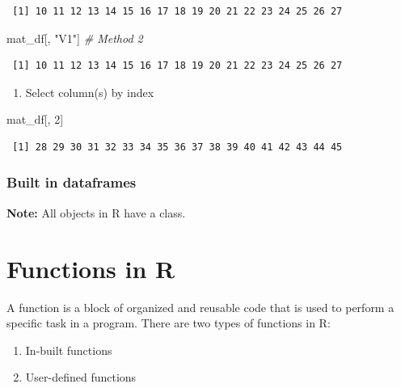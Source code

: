 \documentclass[]{book}
\newenvironment{Shaded}{\begin{snugshade}}{\end{snugshade}}
\newcommand{\CommentTok}[1]{\textcolor[rgb]{0.56,0.35,0.01}{\textit{#1}}}
\newcommand{\DecValTok}[1]{\textcolor[rgb]{0.00,0.00,0.81}{#1}}
\newcommand{\NormalTok}[1]{#1}
\newcommand{\StringTok}[1]{\textcolor[rgb]{0.31,0.60,0.02}{#1}}
\providecommand{\tightlist}{%
  \setlength{\itemsep}{0pt}\setlength{\parskip}{0pt}}
\begin{document}
\begin{verbatim}
 [1] 10 11 12 13 14 15 16 17 18 19 20 21 22 23 24 25 26 27
\end{verbatim}

\begin{Shaded}
\begin{Highlighting}[]
\NormalTok{mat_df[, }\StringTok{"V1"}\NormalTok{] }\CommentTok{# Method 2}
\end{Highlighting}
\end{Shaded}

\begin{verbatim}
 [1] 10 11 12 13 14 15 16 17 18 19 20 21 22 23 24 25 26 27
\end{verbatim}

\begin{enumerate}
\def\labelenumi{\arabic{enumi}.}
\setcounter{enumi}{1}
\tightlist
\item
  Select column(s) by index
\end{enumerate}

\begin{Shaded}
\begin{Highlighting}[]
\NormalTok{mat_df[, }\DecValTok{2}\NormalTok{]}
\end{Highlighting}
\end{Shaded}

\begin{verbatim}
 [1] 28 29 30 31 32 33 34 35 36 37 38 39 40 41 42 43 44 45
\end{verbatim}

\hypertarget{built-in-dataframes}{%
\subsection{Built in dataframes}\label{built-in-dataframes}}

\textbf{Note:} All objects in R have a class.

\hypertarget{function}{%
\chapter{Functions in R}\label{function}}

A function is a block of organized and reusable code that is used to perform a specific task in a program. There are two types of functions in R:

\begin{enumerate}
\def\labelenumi{\arabic{enumi}.}
\item
  In-built functions
\item
  User-defined functions
\end{enumerate}
\end{document}
